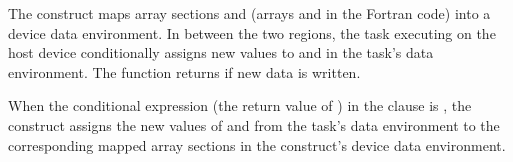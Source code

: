 The   construct maps array sections  and  
(arrays  and  in the Fortran code) into a device data environment. In between 
the two  regions, the task executing on the host device conditionally 
assigns new values to  and  in the task's data environment. The function  
returns  if new data is written.

When the conditional expression (the return value of ) in the 
 clause is , the   construct 
assigns the new values of  and  from the task's data environment to the corresponding 
mapped array sections in the   construct's device data 
environment.



